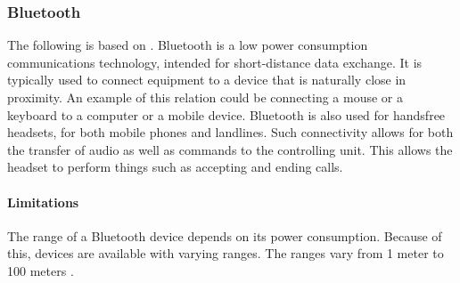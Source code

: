 \subsubsection{Bluetooth}
The following is based on \citet{ieee_bluetooth_standard}.
Bluetooth is a low power consumption communications technology, intended for short-distance data exchange.
It is typically used to connect equipment to a device that is naturally close in proximity.
An example of this relation could be connecting a mouse or a keyboard to a computer or a mobile device.
Bluetooth is also used for handsfree headsets, for both mobile phones and landlines.
Such connectivity allows for both the transfer of audio as well as commands to the controlling unit.
This allows the headset to perform things such as accepting and ending calls.

\paragraph{Limitations}
The range of a Bluetooth device depends on its power consumption.
Because of this, devices are available with varying ranges.
The ranges vary from 1 meter to 100 meters \cite{bt}.